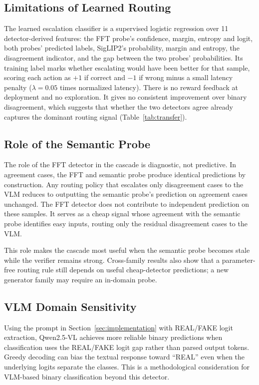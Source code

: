 \documentclass{ieeeaccess}
\begin{document}
\subsection{Limitations of Learned Routing}
\label{sec:learned_routing}

The learned escalation classifier is a supervised logistic regression over 11
detector-derived features: the FFT probe's confidence, margin, entropy and logit, both
probes' predicted labels, SigLIP2's probability, margin and entropy, the disagreement
indicator, and the gap between the two probes' probabilities. Its training label marks
whether escalating would have been better for that sample, scoring each action as $+1$
if correct and $-1$ if wrong minus a small latency penalty ($\lambda{=}0.05$ times
normalized latency). There is no reward feedback at deployment and no exploration. It gives no consistent improvement over binary disagreement, which suggests that whether the two detectors agree already captures the dominant routing signal (Table~\ref{tab:transfer}).

\subsection{Role of the Semantic Probe}
\label{sec:role_semantic}

The role of the FFT detector in the cascade is diagnostic, not predictive. In agreement
cases, the FFT and semantic probe produce identical predictions by construction. Any
routing policy that escalates only disagreement cases to the VLM reduces to outputting
the semantic probe's prediction on agreement cases unchanged. The FFT detector
 does not contribute to independent prediction on these samples. It serves as a cheap signal
whose agreement with the semantic probe identifies easy inputs, routing only the
residual disagreement cases to the VLM.

This role makes the cascade most useful when the semantic probe becomes stale while the
verifier remains strong. Cross-family results also show that a parameter-free routing
rule still depends on useful cheap-detector predictions; a new generator family may
require an in-domain probe.

\subsection{VLM Domain Sensitivity}

Using the prompt in Section~\ref{sec:implementation} with REAL/FAKE logit extraction, Qwen2.5-VL achieves
more reliable binary predictions when classification uses the REAL/FAKE logit gap rather
than parsed output tokens. Greedy decoding can bias the textual response toward
``REAL'' even when the underlying logits separate the classes. This is a methodological
consideration for VLM-based binary classification beyond this detector.
\end{document}
